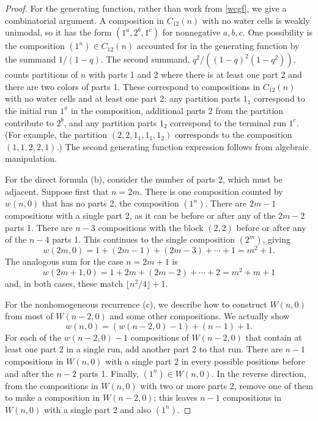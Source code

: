 \documentclass[10pt,a4paper]{amsart}
\begin{document}
\begin{proof}
For the generating function, rather than work from \eqref{wcgf}, we give a combinatorial argument.  A composition in $C_{12}(n)$ with no water cells is weakly unimodal, so it has the form $(1^a, 2^b, 1^c)$ for nonnegative $a,b,c$.  One possibility is the composition $(1^n) \in C_{12}(n)$ accounted for in the generating function by the summand $1/(1-q)$.  The second summand, $q^2/((1-q)^2(1-q^2))$, counts partitions of $n$ with parts 1 and 2 where there is at least one part 2 and there are two colors of parts 1.  These correspond to compositions in $C_{12}(n)$ with no water cells and at least one part 2: any partition parts $1_1$ correspond to the initial run $1^a$ in the composition, additional parts 2 from the partition contribute to $2^b$, and any partition parts $1_2$ correspond to the terminal run $1^c$.  (For example, the partition $(2,2,1_1,1_1,1_2)$ corresponds to the composition $(1,1,2,2,1)$.)  The second generating function expression follows from algebraic manipulation.

For the direct formula (b), consider the number of parts 2, which must be adjacent.  Suppose first that $n = 2m$.  There is one composition counted by $w(n,0)$ that has no parts 2, the composition $(1^n)$.  There are $2m-1$ compositions with a single part 2, as it can be before or after any of the $2m-2$ parts 1.  There are $n-3$ compositions with the block $(2,2)$ before or after any of the $n-4$ parts 1.  This continues to the single composition $(2^m)$, giving
\[w(2m,0) = 1 + (2m-1) + (2m-3) + \cdots + 1 = m^2 + 1.\]
The analogous sum for the case $n = 2m+1$ is
\[w(2m+1,0) = 1 + 2m + (2m-2) + \cdots + 2 = m^2 + m + 1\]
and, in both cases, these match $\lfloor n^2/4 \rfloor + 1$.

For the nonhomogeneous recurrence (c), we describe how to construct $W(n,0)$ from most of $W(n-2,0)$ and some other compositions.  We actually show 
\[w(n,0) = (w(n-2,0) - 1) + (n-1) + 1.\]
For each of the $w(n-2,0) - 1$ compositions of $W(n-2,0)$ that contain at least one part 2 in a single run, add another part 2 to that run.  There are $n-1$ compositions in $W(n,0)$ with a single part 2 in every possible positions before and after the $n-2$ parts 1.  Finally, $(1^n) \in W(n,0)$.  In the reverse direction, from the compositions in $W(n,0)$ with two or more parts 2, remove one of them to make a composition in $W(n-2,0)$; this leaves $n-1$ compositions in $W(n,0)$ with a single part 2 and also $(1^n)$.


\end{proof}
\end{document}
